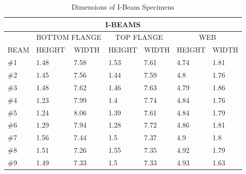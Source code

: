 \begin{longtable}{ | X |  X |  X |  X |  X |  X |  X | }
	\caption{Dimensions of I-Beam Specimens}
	\label{tab:ibeam_dims}
	\endhead
	\hline
	\multicolumn{7}{|c|}{I-BEAMS} \\ \hline
	& \multicolumn{2}{c|}{BOTTOM FLANGE} & \multicolumn{2}{c|}{TOP FLANGE} & \multicolumn{2}{c|}{WEB} \\ \hline
	BEAM & HEIGHT & WIDTH & HEIGHT & WIDTH & HEIGHT & WIDTH \\ \hline
	\#1 & 1.48 & 7.58 & 1.53 & 7.61 & 4.74 & 1.81 \\ \hline
	\#2 & 1.45 & 7.56 & 1.44 & 7.59 & 4.8 & 1.76 \\ \hline
	\#3 & 1.48 & 7.62 & 1.46 & 7.63 & 4.79 & 1.86 \\ \hline
	\#4 & 1.23 & 7.99 & 1.4 & 7.74 & 4.84 & 1.76 \\ \hline
	\#5 & 1.24 & 8.06 & 1.39 & 7.61 & 4.84 & 1.79 \\ \hline
	\#6 & 1.29 & 7.94 & 1.28 & 7.72 & 4.86 & 1.81 \\ \hline
	\#7 & 1.56 & 7.44 & 1.5 & 7.37 & 4.9 & 1.8 \\ \hline
	\#8 & 1.51 & 7.26 & 1.55 & 7.35 & 4.92 & 1.79 \\ \hline
	\#9 & 1.49 & 7.33 & 1.5 & 7.33 & 4.93 & 1.63 \\ \hline
\end{longtable}